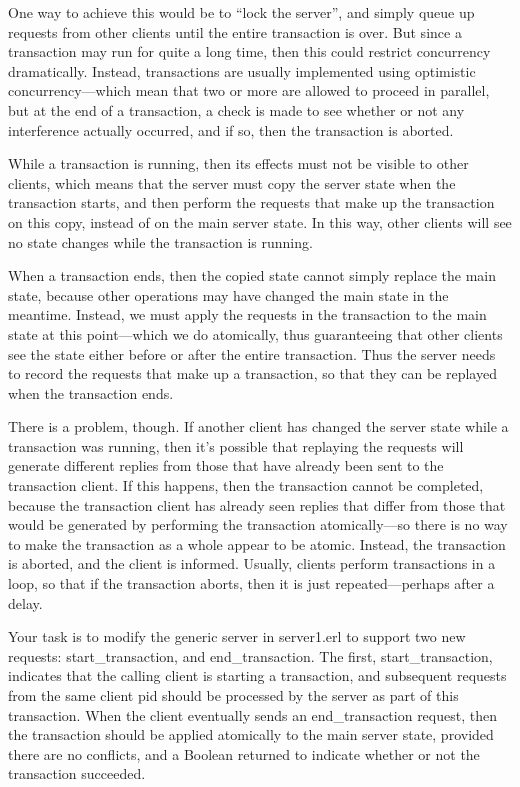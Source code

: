 \documentclass{article}
\begin{document}
One way to achieve this would be to “lock the server”, and simply queue up requests from other clients until the entire transaction is over.  But since a transaction may run for quite a long time, then this could restrict concurrency dramatically. Instead, transactions are usually implemented using optimistic concurrency—which mean that two or more are allowed to proceed in parallel, but at the end of a transaction, a check is made to see whether or not any interference actually occurred, and if so, then the transaction is aborted.

While a transaction is running, then its effects must not be visible to other clients, which means that the server must copy the server state when the transaction starts, and then perform the requests that make up the transaction on this copy, instead of on the main server state. In this way, other clients will see no state changes while the transaction is running.


When a transaction ends, then the copied state cannot simply replace the main state, because other operations may have changed the main state in the meantime. Instead, we must apply the requests in the transaction to the main state at this point—which we do atomically, thus guaranteeing that other clients see the state either before or after the entire transaction.  Thus the server needs to record the requests that make up a transaction, so that they can be replayed when the transaction ends.

There is a problem, though. If another client has changed the server state while a transaction was running, then it’s possible that replaying the requests will generate different replies from those that have already been sent to the transaction client. If this happens, then the transaction cannot be completed, because the transaction client has already seen replies that differ from those that would be generated by performing the transaction atomically—so there is no way to make the transaction as a whole appear to be atomic. Instead, the transaction is aborted, and the client is informed. Usually, clients perform transactions in a loop, so that if the transaction aborts, then it is just repeated—perhaps after a delay.

Your task is to modify the generic server in \textsf{server1.erl} to support
two new requests: \textsf{start\_transaction}, and
\textsf{end\_transaction}. The first, \textsf{start\_transaction},
indicates that the calling client is starting a transaction, and
subsequent requests from the same client pid should be processed by
the server as part of this transaction. When the client eventually
sends an \textsf{end\_transaction} request, then the transaction
should be applied atomically to the main server state, provided there
are no conflicts, and a Boolean returned to indicate whether or not
the transaction succeeded.
\end{document}
